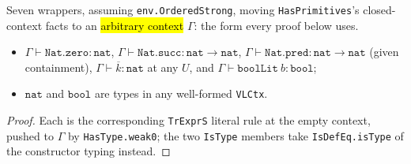 \begin{lemma}
\label{vpc:thm:prim-nat-bool-typing}
\leanok
{}

 Seven wrappers, assuming \texttt{env.OrderedStrong}, moving
\texttt{HasPrimitives}'s closed-context facts to an \hl{arbitrary context} $\Gamma$: the form
every proof below uses.
\begin{itemize}
\item $\Gamma \vdash \mathtt{Nat.zero} : \mathtt{nat}$, $\Gamma \vdash \mathtt{Nat.succ} :
\mathtt{nat} \to \mathtt{nat}$, $\Gamma \vdash \mathtt{Nat.pred} : \mathtt{nat} \to \mathtt{nat}$
(given containment), $\Gamma \vdash \overline{k} : \mathtt{nat}$ at any $U$, and $\Gamma \vdash
\mathtt{boolLit}\ b : \mathtt{bool}$;
\item $\mathtt{nat}$ and $\mathtt{bool}$ are types in any well-formed \texttt{VLCtx}.
\end{itemize}
\end{lemma}
\begin{proof}\leanok
{}
 Each is the corresponding \texttt{TrExprS} literal rule at the empty context, pushed
to $\Gamma$ by \texttt{HasType.weak0}; the two \texttt{IsType} members take
\texttt{IsDefEq.isType} of the constructor typing instead.
\end{proof}

